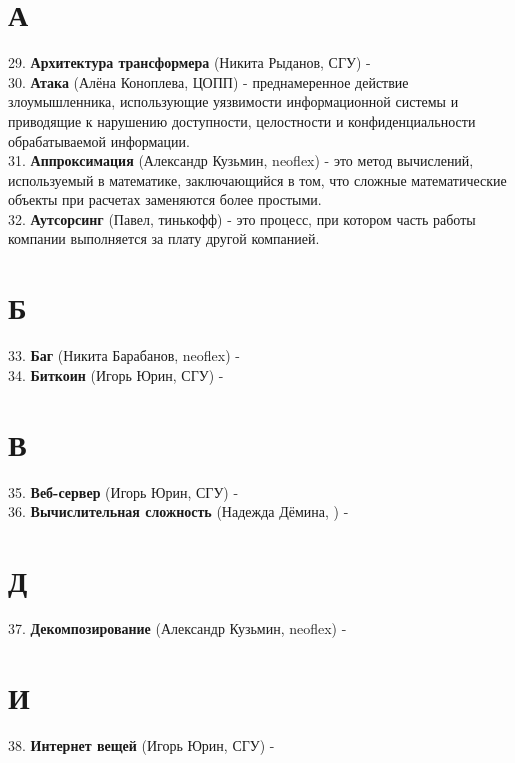 \documentclass[14 pt]{extarticle}
\begin{document}
\section*{А}
    29. \textbf{Архитектура трансформера} (Никита Рыданов, СГУ) - \\
    
    30. \textbf{Атака} (Алёна Коноплева, ЦОПП) - преднамеренное действие злоумышленника, использующие уязвимости информационной системы и приводящие к нарушению доступности, целостности и конфиденциальности обрабатываемой информации.\\
    
    31. \textbf{Аппроксимация} (Александр Кузьмин, neoflex) - это метод вычислений, используемый в математике, заключающийся в том, что сложные математические объекты при расчетах заменяются более простыми. \\

    32. \textbf{Аутсорсинг} (Павел, тинькофф) - это процесс, при котором часть работы компании выполняется за плату другой компанией. \\
    
\section*{Б}
    33. \textbf{Баг} (Никита Барабанов, neoflex) - \\
    
    34. \textbf{Биткоин} (Игорь Юрин, СГУ) - \\
    
\section*{В}
    35. \textbf{Веб-сервер} (Игорь Юрин, СГУ) - \\
    
    36. \textbf{Вычислительная сложность} (Надежда Дёмина, ) - \\
    
\section*{Д}
    37. \textbf{Декомпозирование} (Александр Кузьмин, neoflex) - \\
    
\section*{И}
    38. \textbf{Интернет вещей} (Игорь Юрин, СГУ) - \\
    
\end{document}
